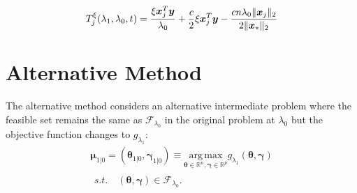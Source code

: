 \begin{equation}
    T^\xi_j(\lambda_1,\lambda_0,t)=\frac{\xi \boldsymbol x_j^T \boldsymbol y}{\lambda_0}+\frac{c}{2}\xi\boldsymbol x_j^T\boldsymbol y-\frac{cn\lambda_0\lVert\boldsymbol x_j\rVert_2}{2\lVert\boldsymbol x_*\rVert_2}
\end{equation}

\fi

\section{Alternative Method}
\label{sec:alternative-method}

The alternative method considers an alternative intermediate problem where the feasible set remains the same as $\mathcal{F}_{\lambda_0}$ in the original problem at $\lambda_0$ but the objective function changes to $g_{\lambda_1}$:
\begin{gather}
        \label{eq:dualmialt}
        \boldsymbol\mu_{1|0}=(\boldsymbol\theta_{1|0},\boldsymbol\gamma_{1|0})\equiv\underset{\boldsymbol\theta\in \mathbb{R}^{ n},\boldsymbol\gamma\in\mathbb{R}^p}{\mathrm{arg\,max}}g_{\lambda_1}(\boldsymbol\theta,\boldsymbol\gamma)\\
        \begin{aligned}s.t.\quad (\boldsymbol\theta,\boldsymbol\gamma)\in \mathcal{F}_{\lambda_0}\nonumber.
        \end{aligned}
\end{gather}

